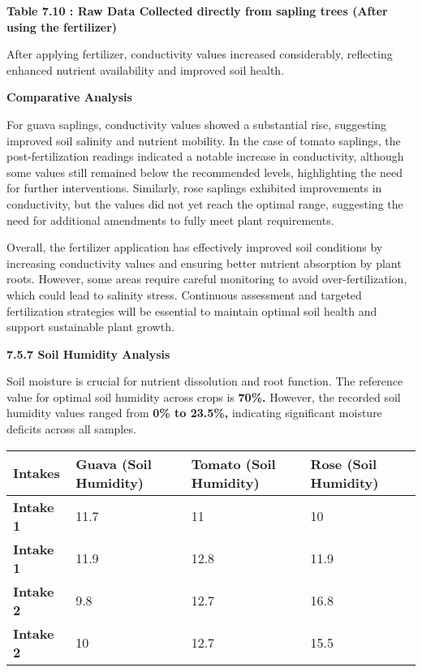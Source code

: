 \documentclass{book} %
\begin{document}
\textbf{Table 7.10 : Raw Data Collected directly from sapling trees (After using the fertilizer)}

\noindent After applying fertilizer, conductivity values increased considerably, reflecting enhanced nutrient availability and improved soil health.\textbf{}

\noindent \textbf{Comparative Analysis}

\noindent For guava saplings, conductivity values showed a substantial rise, suggesting improved soil salinity and nutrient mobility. In the case of tomato saplings, the post-fertilization readings indicated a notable increase in conductivity, although some values still remained below the recommended levels, highlighting the need for further interventions. Similarly, rose saplings exhibited improvements in conductivity, but the values did not yet reach the optimal range, suggesting the need for additional amendments to fully meet plant requirements.

\noindent Overall, the fertilizer application has effectively improved soil conditions by increasing conductivity values and ensuring better nutrient absorption by plant roots. However, some areas require careful monitoring to avoid over-fertilization, which could lead to salinity stress. Continuous assessment and targeted fertilization strategies will be essential to maintain optimal soil health and support sustainable plant growth.

\noindent \textbf{}

\noindent 

\noindent \textbf{7.5.7 Soil Humidity Analysis}

\noindent Soil moisture is crucial for nutrient dissolution and root function. The reference value for optimal soil humidity across crops is \textbf{70\%.} However, the recorded soil humidity values ranged from \textbf{0\% to 23.5\%,} indicating significant moisture deficits across all samples.

\noindent \textbf{}

\begin{tabular}{|p{0.7in}|p{0.7in}|p{0.8in}|p{0.8in}|} \hline 
\textbf{Intakes} & \textbf{Guava (Soil Humidity)} & \textbf{Tomato (Soil Humidity)} & \textbf{Rose (Soil Humidity)} \\ \hline 
\textbf{Intake 1} & 11.7 & 11 & 10 \\ \hline 
\textbf{Intake 1} & 11.9 & 12.8 & 11.9 \\ \hline 
\textbf{Intake 2} & 9.8 & 12.7 & 16.8 \\ \hline 
\textbf{Intake 2} & 10 & 12.7 & 15.5 \\ \hline 
\end{tabular}
\end{document}
